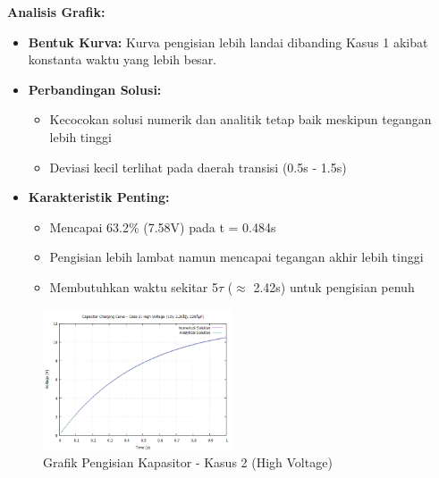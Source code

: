 \documentclass[conference]{IEEEtran}
\begin{document}
\textbf{Analisis Grafik:}
\begin{itemize}
\item \textbf{Bentuk Kurva:} Kurva pengisian lebih landai dibanding Kasus 1 akibat konstanta waktu yang lebih besar.
\item \textbf{Perbandingan Solusi:}
  \begin{itemize}
  \item Kecocokan solusi numerik dan analitik tetap baik meskipun tegangan lebih tinggi
  \item Deviasi kecil terlihat pada daerah transisi (0.5s - 1.5s)
  \end{itemize}
\item \textbf{Karakteristik Penting:}
  \begin{itemize}
  \item Mencapai 63.2\% (7.58V) pada t = 0.484s
  \item Pengisian lebih lambat namun mencapai tegangan akhir lebih tinggi
  \item Membutuhkan waktu sekitar 5$\tau$ ($\approx$ 2.42s) untuk pengisian penuh
  \end{itemize}
\end{itemize}

\begin{figure}[H]
    \centering
    \includegraphics[width=0.5\textwidth]{Grafik/Grafik2.png}
    \caption{Grafik Pengisian Kapasitor - Kasus 2 (High Voltage)}
    \label{fig:case2}
\end{figure}
\end{document}
